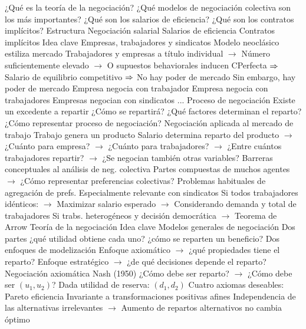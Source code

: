 \documentclass{nuevotema}
\begin{document}
\begin{esquemal}
			\3 ¿Qué es la teoría de la negociación?
			\3 ¿Qué modelos de negociación colectiva son los más importantes?
			\3 ¿Qué son los salarios de eficiencia?
			\3 ¿Qué son los contratos implícitos?
		\2 Estructura
			\3 Negociación salarial
			\3 Salarios de eficiencia
			\3 Contratos implícitos
	\1 
		\2 Idea clave
			\3 Empresas, trabajadores y sindicatos
				\4 Modelo neoclásico estiliza mercado
				\4[] Trabajadores y empresas a título individual
				\4[] $\to$ Número suficientemente elevado
				\4[] $\to$ O supuestos behaviorales inducen CPerfecta
				\4[] $\Rightarrow$ Salario de equilibrio competitivo
				\4[] $\Rightarrow$ No hay poder de mercado
				\4 Sin embargo, hay poder de mercado
				\4[] Empresa negocia con trabajador
				\4[] Empresa negocia con trabajadores
				\4[] Empresas negocian con sindicatos
				\4[] ...
			\3 Proceso de negociación
				\4 Existe un excedente a repartir
				\4 ¿Cómo se repartirá?
				\4 ¿Qué factores determinan el reparto?
				\4 ¿Cómo representar proceso de negociación?
			\3 Negociación aplicada al mercado de trabajo
				\4 Trabajo genera un producto
				\4 Salario determina reparto del producto
				\4[] $\to$ ¿Cuánto para empresa?
				\4[] $\to$ ¿Cuánto para trabajadores?
				\4[] $\to$ ¿Entre cuántos trabajadores repartir?
				\4[] $\to$ ¿Se negocian también otras variables?
			\3 Barreras conceptuales al análisis de neg. colectiva
				\4 Partes compuestas de muchos agentes
				\4[] $\to$ ¿Cómo representar preferencias colectivas?
				\4[] Problemas habituales de agregación de prefs.
				\4[] Especialmente relevante con sindicatos
				\4[] Si todos trabajadores idénticos:
				\4[] $\to$ Maximizar salario esperado
				\4[] $\to$ Considerando demanda y total de trabajadores
				\4[] Si trabs. heterogéneos y decisión democrática
				\4[] $\to$ Teorema de Arrow
		\2 Teoría de la negociación
			\3 Idea clave
				\4 Modelos generales de negociación
				\4 Dos partes
				\4[] ¿qué utilidad obtiene cada uno?
				\4[] ¿cómo se reparten un beneficio?
				\4 Dos enfoques de modelización
				\4[] Enfoque axiomático
				\4[] $\to$ ¿qué propiedades tiene el reparto?
				\4[] Enfoque estratégico
				\4[] $\to$ ¿de qué decisiones depende el reparto?
			\3 Negociación axiomática
				\4 Nash (1950)
				\4 ¿Cómo debe ser reparto?
				\4[] $\to$ ¿Cómo debe ser $(u_1,u_2)$?
				\4[] Dada utilidad de reserva: $(d_1,d_2)$
				\4 Cuatro axiomas deseables:
				\4[] Pareto eficiencia
				\4[] Invariante a transformaciones positivas afines
				\4[] Independencia de las alternativas irrelevantes
				\4[] $\to$ Aumento de repartos alternativos no cambia óptimo

\end{esquemal}
\end{document}
